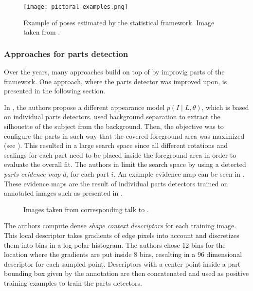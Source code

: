 \begin{figure}[htb!]
    \centering
    \texttt{[image: pictoral-examples.png]}
    \caption{Example of poses estimated by the statistical framework. Image taken from \cite{felzenszwalb_pictorial_2005}.}
    \label{fig:pictoral-examples}
\end{figure}

\subsubsection{Approaches for parts detection}
\label{sec:pose-andriluka}
Over the years, many approaches build on top of \cite{felzenszwalb_pictorial_2005} by improvig parts of the framework.
One approach, where the parts detector was improved upon, is presented in the following section.

In \cite{andriluka_pictorial_2009}, the authors propose a different appearance model $p(I \mid L, \theta)$, which is based on individual parts detectors.
\cite{felzenszwalb_pictorial_2005} used background separation to extract the silhouette of the subject from the background.
Then, the objective was to configure the parts in such way that the covered foreground area was maximized (see ).
This resulted in a large search space since all different rotations and scalings for each part need to be placed inside the foreground area in order to evaluate the overall fit.
The authors in \cite{andriluka_pictorial_2009} limit the search space by using a detected \textit{parts evidence map} $d_i$ for each part $i$.
An example evidence map can be seen in .
These evidence maps are the result of individual parts detectors trained on annotated images such as presented in .

\begin{figure}
    \centering
    \hspace{20px}
    \caption{Images taken from corresponding talk to \cite{andriluka_pictorial_2009}.}
\end{figure}

The authors compute dense \textit{shape context descriptors} \cite{belongie_shape_2002} for each training image.
This local descriptor takes gradients of edge pixels into account and discretizes them into bins in a log-polar histogram.
The authors chose $12$ bins for the location where the gradients are put inside $8$ bins, resulting in a $96$ dimensional descriptor for each sampled point.
Descriptors with a center point inside a part bounding box given by the annotation are then concatenated and used as positive training examples to train the parts detectors.

